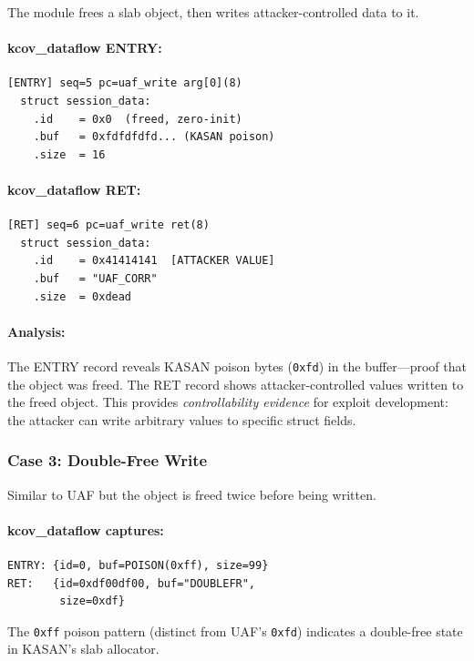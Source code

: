 \documentclass{ndss}
\begin{document}
The module frees a slab object, then writes attacker-controlled data to it.

\paragraph{kcov\_dataflow ENTRY:}
\begin{lstlisting}[numbers=none]
[ENTRY] seq=5 pc=uaf_write arg[0](8)
  struct session_data:
    .id    = 0x0  (freed, zero-init)
    .buf   = 0xfdfdfdfd... (KASAN poison)
    .size  = 16
\end{lstlisting}

\paragraph{kcov\_dataflow RET:}
\begin{lstlisting}[numbers=none]
[RET] seq=6 pc=uaf_write ret(8)
  struct session_data:
    .id    = 0x41414141  [ATTACKER VALUE]
    .buf   = "UAF_CORR"
    .size  = 0xdead
\end{lstlisting}

\paragraph{Analysis:} The ENTRY record reveals KASAN poison bytes
(\texttt{0xfd}) in the buffer---proof that the object was freed. The RET record
shows attacker-controlled values written to the freed object. This provides
\emph{controllability evidence} for exploit development: the attacker can write
arbitrary values to specific struct fields.

\subsubsection{Case 3: Double-Free Write}

Similar to UAF but the object is freed twice before being written.

\paragraph{kcov\_dataflow captures:}
\begin{lstlisting}[numbers=none]
ENTRY: {id=0, buf=POISON(0xff), size=99}
RET:   {id=0xdf00df00, buf="DOUBLEFR",
        size=0xdf}
\end{lstlisting}

The \texttt{0xff} poison pattern (distinct from UAF's \texttt{0xfd}) indicates
a double-free state in KASAN's slab allocator.
\end{document}
